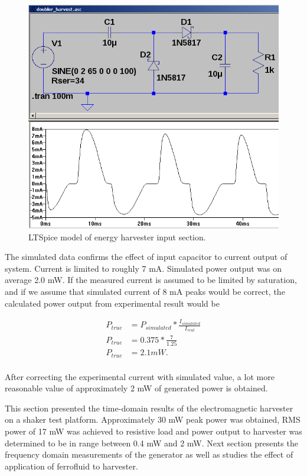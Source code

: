 \begin{figure}[htb]
\begin{center}
\includegraphics[height=10cm]{images/own_dwg/simulation/voltage_doubler.png}
\end{center}
\caption{\label{fig:simulated_doubler} LTSpice model of energy harvester input section.}
\end{figure}

The simulated data confirms the effect of input capacitor to current output of system. Current is limited to roughly 7 mA. Simulated power output was on average 2.0 mW. If the measured current is assumed to be limited by saturation, and if we assume that simulated current of 8 mA peaks would be correct, the calculated power output from experimental result would be 

\begin{equation}
\begin{split}
  P_{true}& = P_{simulated} * \frac{I_{simulated}}{I_{real}} \\
  P_{true}& = 0.375 * \frac{7}{1.25} \\
  P_{true}& = 2.1 mW. \\
\end{split}
\end{equation}

After correcting the experimental current with simulated value, a lot more reasonable value of approximately 2 mW of generated power is obtained. 

This section presented the time-domain results of the electromagnetic harvester on a shaker test platform. Approximately 30 mW peak power was obtained, RMS power of 17 mW was achieved to resistive load and power output to harvester was determined to be in range between 0.4 mW and 2 mW. Next section presents the frequency domain measurements of the generator as well as studies the effect of application of ferrofluid to harvester.

